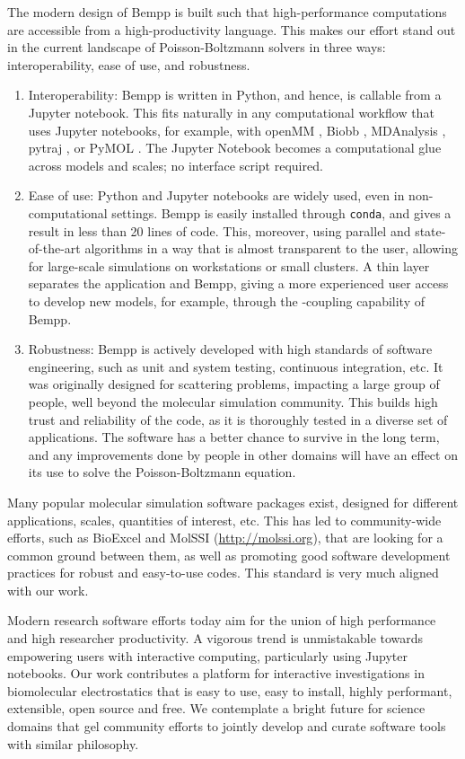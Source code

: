 The modern design of Bempp is built such that high-performance computations are accessible from a high-productivity language.
This makes our effort stand out in the current landscape of Poisson-Boltzmann solvers in three ways: interoperability, ease of use, and robustness. 
\begin{enumerate}
\item Interoperability: Bempp is written in Python, and hence, is callable from a Jupyter notebook. This fits naturally in any computational workflow that uses Jupyter notebooks, for example, with openMM \cite{EastmanETal2017}, Biobb \cite{AndrioETal2019}, MDAnalysis \cite{GowersETal2019}, pytraj \cite{RoeCheatham2013}, or PyMOL \cite{PyMOL}. The Jupyter Notebook becomes a computational glue across models and scales; no interface script required. 

\item Ease of use: Python and Jupyter notebooks are widely used, even in non-computational settings. Bempp is easily installed through \texttt{conda}, and gives a result in less than 20 lines of code. This, moreover, using parallel and state-of-the-art algorithms in a way that is almost transparent to the user, allowing for large-scale simulations on workstations or small clusters.
A thin layer separates the application and Bempp, giving a more experienced user access to develop new models, for example, through the \fmm-\bem coupling capability of Bempp.

\item Robustness: Bempp is actively developed with high standards of software engineering, such as unit and system testing, continuous integration, etc. It was originally designed for scattering problems, impacting a large group of people, well beyond the molecular simulation community. This builds high trust and reliability of the code, as it is thoroughly tested in a diverse set of applications. The software has a better chance to survive in the long term, and any improvements done by people in other domains will have an effect on its use to solve the Poisson-Boltzmann equation. 

\end{enumerate}

Many popular molecular simulation software packages exist, designed for different applications, scales, quantities of interest, etc.
This has led to community-wide efforts, such as BioExcel and MolSSI (\url{http://molssi.org}), that are looking for a common ground between them, as well as promoting good software development practices for robust and easy-to-use codes.
This standard is very much aligned with our work.

Modern research software efforts today aim for the union of high performance and high researcher productivity.
A vigorous trend is unmistakable towards empowering users with interactive computing, particularly using Jupyter notebooks. 
Our work contributes a platform for interactive investigations in biomolecular electrostatics that is easy to use, easy to install, highly performant, extensible, open source and free.
We contemplate a bright future for science domains that gel community efforts to jointly develop and curate software tools with similar philosophy.